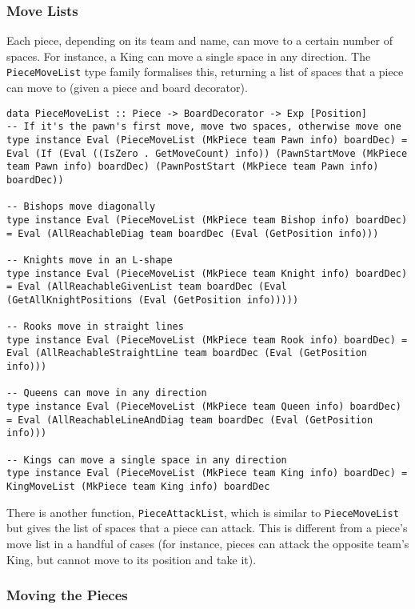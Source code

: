 \documentclass[12pt, a4paper]{scrartcl}
\begin{document}
\subsubsection{Move Lists}

Each piece, depending on its team and name, can move to a certain number of spaces. For instance, a King can move a single space in any direction. The \lstinline{PieceMoveList} type family formalises this, returning a list of spaces that a piece can move to (given a piece and board decorator).

\begin{lstlisting}
data PieceMoveList :: Piece -> BoardDecorator -> Exp [Position]
-- If it's the pawn's first move, move two spaces, otherwise move one
type instance Eval (PieceMoveList (MkPiece team Pawn info) boardDec) = Eval (If (Eval ((IsZero . GetMoveCount) info)) (PawnStartMove (MkPiece team Pawn info) boardDec) (PawnPostStart (MkPiece team Pawn info) boardDec))

-- Bishops move diagonally
type instance Eval (PieceMoveList (MkPiece team Bishop info) boardDec) = Eval (AllReachableDiag team boardDec (Eval (GetPosition info)))

-- Knights move in an L-shape
type instance Eval (PieceMoveList (MkPiece team Knight info) boardDec) = Eval (AllReachableGivenList team boardDec (Eval (GetAllKnightPositions (Eval (GetPosition info)))))

-- Rooks move in straight lines
type instance Eval (PieceMoveList (MkPiece team Rook info) boardDec) = Eval (AllReachableStraightLine team boardDec (Eval (GetPosition info)))

-- Queens can move in any direction
type instance Eval (PieceMoveList (MkPiece team Queen info) boardDec) = Eval (AllReachableLineAndDiag team boardDec (Eval (GetPosition info)))

-- Kings can move a single space in any direction
type instance Eval (PieceMoveList (MkPiece team King info) boardDec) = KingMoveList (MkPiece team King info) boardDec
\end{lstlisting}

There is another function, \lstinline{PieceAttackList}, which is similar to \lstinline{PieceMoveList} but gives the list of spaces that a piece can attack. This is different from a piece's move list in a handful of cases (for instance, pieces can attack the opposite team's King, but cannot move to its position and take it).

\subsubsection{Moving the Pieces}
\end{document}
